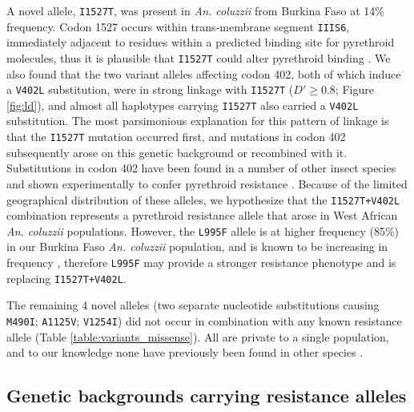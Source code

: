\documentclass[a4paper,11pt,abstracton,hidelinks]{scrartcl}
\begin{document}
%
A novel allele, \texttt{I1527T}, was present in \textit{An. coluzzii} from Burkina Faso at 14\% frequency.
%
Codon 1527 occurs within trans-membrane segment \texttt{IIIS6}, immediately adjacent to residues within a predicted binding site for pyrethroid molecules, thus it is plausible that \texttt{I1527T} could alter pyrethroid binding \cite{Du2013,Dong2014}.
%
We also found that the two variant alleles affecting codon 402, both of which induce a \texttt{V402L} substitution, were in strong linkage with \texttt{I1527T} ($D' \geq 0.8$; Figure \ref{fig:ld}), and almost all haplotypes carrying \texttt{I1527T} also carried a \texttt{V402L} substitution.
%
The most parsimonious explanation for this pattern of linkage is that the \texttt{I1527T} mutation occurred first, and mutations in codon 402 subsequently arose on this genetic background or recombined with it.
%
Substitutions in codon 402 have been found in a number of other insect species and shown experimentally to confer pyrethroid resistance \cite{Dong2014}.
%
Because of the limited geographical distribution of these alleles, we hypothesize that the \texttt{I1527T+V402L} combination represents a pyrethroid resistance allele that arose in West African \textit{An. coluzzii} populations.
%
However, the \texttt{L995F} allele is at higher frequency (85\%) in our Burkina Faso \textit{An. coluzzii} population, and is known to be increasing in frequency \cite{Toe2014}, therefore \texttt{L995F} may provide a stronger resistance phenotype and is replacing \texttt{I1527T+V402L}.


%
The remaining 4 novel alleles (two separate nucleotide substitutions causing \texttt{M490I}; \texttt{A1125V}; \texttt{V1254I}) did not occur in combination with any known resistance allele (Table \ref{table:variants_missense}).
%
All are private to a single population, and to our knowledge none have previously been found in other species \cite{Rinkevich2013, Dong2014}.


\subsection*{Genetic backgrounds carrying resistance alleles}
\end{document}
